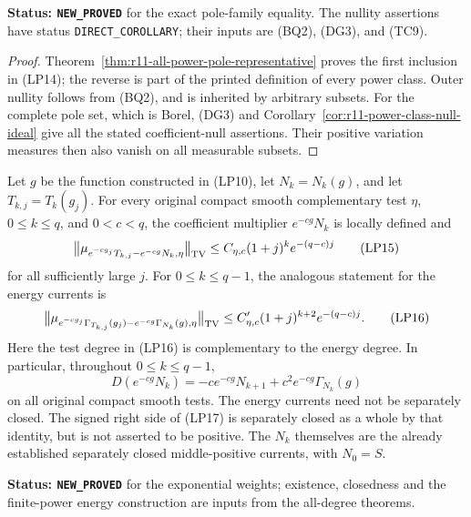 \noindent\textbf{Status: \texttt{NEW\_PROVED}} for the exact
pole-family equality. The nullity assertions have status
\texttt{DIRECT\_COROLLARY}; their inputs are (BQ2), (DG3), and (TC9).

\begin{proof}
Theorem~\ref{thm:r11-all-power-pole-representative} proves the
first inclusion in (LP14); the reverse is part of the printed
definition of every power class. Outer nullity follows from
(BQ2), and is inherited by arbitrary subsets. For the complete
pole set, which is Borel, (DG3) and
Corollary~\ref{cor:r11-power-class-null-ideal} give all the
stated coefficient-null assertions. Their positive variation
measures then also vanish on all measurable subsets.
\end{proof}

\begin{corollary}
\label{cor:r11-logarithmic-all-degree-exponential}
Let $g$ be the function constructed in (LP10), let
$N_k=N_k(g)$, and let $T_{k,j}=T_k(g_j)$.
For every original compact smooth complementary test $\eta$,
$0\leq k\leq q$, and $0<c<q$, the coefficient multiplier
$e^{-cg}N_k$ is locally defined and
\[
 \bigl\|\mu_{e^{-cg_j}T_{k,j}-e^{-cg}N_k,\eta}\bigr\|_{\rm TV}
       \leq C_{\eta,c}(1+j)^k e^{-(q-c)j}
 \tag{LP15}
\]
for all sufficiently large $j$. For $0\leq k\leq q-1$,
the analogous statement for the energy currents is
\[
 \bigl\|\mu_{e^{-cg_j}\Gamma_{T_{k,j}}(g_j)
                     -e^{-cg}\Gamma_{N_k}(g),\eta}\bigr\|_{\rm TV}
       \leq C'_{\eta,c}(1+j)^{k+2}e^{-(q-c)j}.
 \tag{LP16}
\]
Here the test degree in (LP16) is complementary to the energy
degree. In particular, throughout $0\leq k\leq q-1$,
\[
 D(e^{-cg}N_k)
      =-c e^{-cg}N_{k+1}
                          +c^2e^{-cg}\Gamma_{N_k}(g)
 \tag{LP17}
\]
on all original compact smooth tests. The energy currents need
not be separately closed. The signed right side of (LP17) is
separately closed as a whole by that identity, but is not
asserted to be positive. The $N_k$ themselves are the already established
separately closed middle-positive currents, with $N_0=S$.
\end{corollary}

\noindent\textbf{Status: \texttt{NEW\_PROVED}} for the
exponential weights; existence, closedness and the finite-power
energy construction are inputs from the all-degree theorems.

